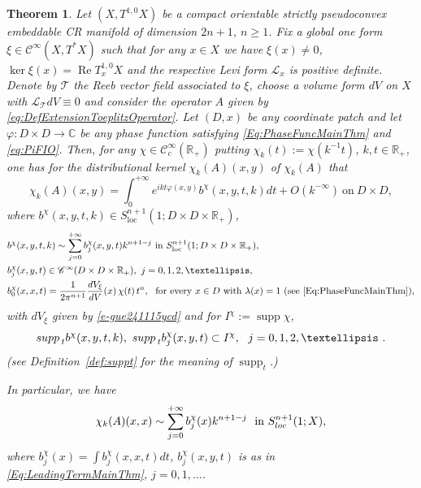 \documentclass[12pt]{amsart}
\newtheorem{theorem}{Theorem}[section]
\theoremstyle{definition}
\theoremstyle{named}
\numberwithin{equation}{subsection}
\newcommand{\R}{\mathbb{R}}
\newcommand{\C}{\mathbb{C}}
\def\cC{\mathscr{C}}
\begin{document}
 \begin{theorem}\label{thm:ExpansionMain}
Let $(X,T^{1,0}X)$ be a compact orientable strictly pseudoconvex embeddable CR manifold of dimension $2n+1$, \(n\geq 1\). Fix a global one form $\xi\in\cC^\infty(X,T^*X)$ such that for any \(x\in X\) we have $\xi(x)\neq0$,  $\ker\xi(x)=\operatorname{Re}T_x^{1,0}X$ and the respective Levi form $\mathcal{L}_x$ is positive definite. Denote by \(\mathcal{T}\) the Reeb vector field associated to \(\xi\), choose a volume form \(dV\) on \(X\) with $\mathcal{L}_{\mathcal{T}}dV\equiv 0$  and consider the operator \(A\) given by  \eqref{eq:DefExtensionToeplitzOperator}.  
Let $(D,x)$ be any coordinate patch and let 
$\varphi:D\times D\to\C$ be any phase function satisfying 
\eqref{Eq:PhaseFuncMainThm} and \eqref{eq:PiFIO}.
Then,  for any \(\chi\in \mathscr{C}^\infty_c(\R_+)\) putting \(\chi_k(t):=\chi(k^{-1}t)\), \(k,t\in\R_+\), one has for the distributional kernel $\chi_k(A)(x,y)$ of $\chi_k(A)$ that
\begin{equation}
\label{eq:asymptotic expansion of chi_k(T_P)}
\chi_k(A)(x,y)=\int_0^{+\infty} 
e^{ikt\varphi(x,y)}b^\chi(x,y,t,k)dt+O\left(k^{-\infty}\right)~\text{on}~D\times D,
\end{equation}
where $b^\chi(x,y,t,k)\in S^{n+1}_{\mathrm{loc}}
(1;D\times D\times{\R}_+)$,
\begin{equation}
\label{Eq:LeadingTermMainThm}
\begin{split}
&b^\chi(x,y,t,k)\sim\sum_{j=0}^{+\infty}b^\chi_{j}(x,y,t)k^{n+1-j}~
\text{in $S^{n+1}_{\mathrm{loc}}(1;D\times D\times{\R}_+)$},\\
&b^\chi_j(x,y,t)\in\mathscr{C}^\infty(D\times D\times{\R}_+),~j=0,1,2,\ldots,\\
&b^\chi_{0}(x,x,t)=\frac{1}{2\pi ^{n+1}}
\frac{dV_{\xi}}{dV}(x)\,\chi(t)\,t^n,\ \ \mbox{for every $x\in D$ with \(\lambda(x)=1\) (see \eqref{Eq:PhaseFuncMainThm})},
\end{split}
\end{equation}
with \(dV_\xi\) given by \eqref{e-gue241115ycd} and for $I^\chi:=\operatorname{supp}\chi$,
\begin{equation}\label{e-gue241115ycda}
\begin{split}
{\rm supp\,}_t b^\chi(x,y,t,k),~{\rm supp\,}_t b^\chi_j(x,y,t)\subset I^\chi,\ \ j=0,1,2,\ldots~.
\end{split}
\end{equation}
(see Definition~\ref{def:suppt} for the meaning of \(\operatorname{supp}_t\).)

In particular, we have 
\begin{equation}\label{e-gue241115ycdI}
\chi_k(A)(x,x)\sim\sum^{+\infty}_{j=0}b^\chi_j(x)k^{n+1-j}\ \ \mbox{in $S^{n+1}_{{\rm loc\,}}(1;X)$}, 
\end{equation}
where $b^\chi_j(x)=\int b^\chi_j(x,x,t)dt$, $b^\chi_j(x,y,t)$ is as in \eqref{Eq:LeadingTermMainThm}, $j=0,1,\ldots$. 
\end{theorem} 
\end{document}
